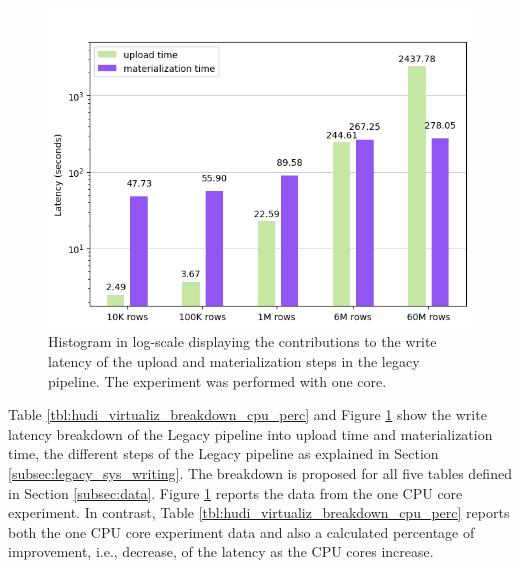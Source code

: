 \begin{figure}
\begin{minipage}[b]{\textwidth}
\begin{tabular}{r S[table-format=4.2] S[table-format=4.2] S[table-format=2.2] S[table-format=2.2] S[table-format=2.2] S[table-format=2.2] S[table-format=2.2] S[table-format=2.2]}
            \bottomrule
        \end{tabular}
    \end{minipage}
    \begin{minipage}[b]{\textwidth}
        \includegraphics[width=\textwidth]{figures/5-results/hudi_virtualiz_1_core.png}
        \caption[Histogram of the write on legacy pipeline - Time breakdown - 1 core]{Histogram in log-scale displaying the contributions to the write latency of the upload and materialization steps in the legacy pipeline. The experiment was performed with one  core.}
        \label{fig:hudi_virtualiz_breakdown}
    \end{minipage}
\end{figure}

Table \ref{tbl:hudi_virtualiz_breakdown_cpu_perc} and Figure \ref{fig:hudi_virtualiz_breakdown} show the write latency breakdown of the Legacy pipeline into upload time and materialization time, the different steps of the Legacy pipeline as explained in Section \ref{subsec:legacy_sys_writing}. The breakdown is proposed for all five tables defined in Section \ref{subsec:data}. Figure \ref{fig:hudi_virtualiz_breakdown} reports the data from the one \gls{CPU} core experiment. In contrast, Table \ref{tbl:hudi_virtualiz_breakdown_cpu_perc} reports both the one \gls{CPU} core experiment data and also a calculated percentage of improvement, i.e., decrease, of the latency as the \gls{CPU} cores increase.

